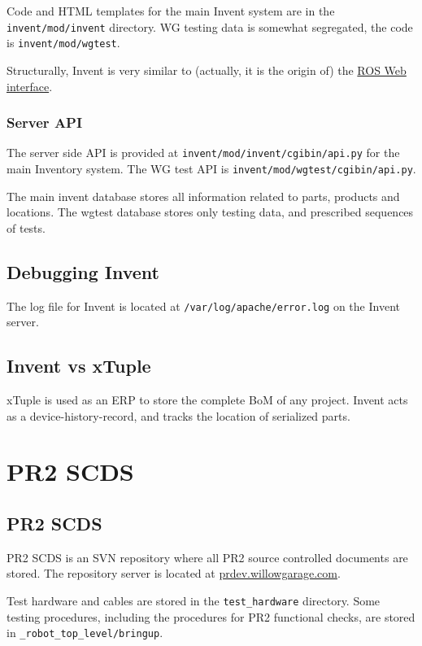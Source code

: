 \documentclass[11pt]{report}
\begin{document}
Code and HTML templates for the main Invent system are in the \texttt{invent/mod/invent} directory. WG testing data is somewhat segregated, the code is \texttt{invent/mod/wgtest}.

Structurally, Invent is very similar to (actually, it is the origin of) the \href{http://www.ros.org/wiki/web\_interface}{ROS Web interface}. 

\subsection{Server API}

The server side API is provided at \texttt{invent/mod/invent/cgibin/api.py} for the main Inventory system. The WG test API is  \texttt{invent/mod/wgtest/cgibin/api.py}.

The main invent database stores all information related to parts, products and locations. The wgtest database stores only testing data, and prescribed sequences of tests. 


\section{Debugging Invent}

The log file for Invent is located at \texttt{/var/log/apache/error.log} on the Invent server. 

\section{Invent vs xTuple}

xTuple is used as an ERP to store the complete BoM of any project. Invent acts as a device-history-record, and tracks the location of serialized parts.

\chapter {PR2 SCDS}

\section{PR2 SCDS}

PR2 SCDS is an SVN repository where all PR2 source controlled documents are stored. The repository server is located at \href{http://prdev.willowgarage.com}{prdev.willowgarage.com}.

Test hardware and cables are stored in the \texttt{test\_hardware} directory. Some testing procedures, including the procedures for PR2 functional checks, are stored in \texttt{\_robot\_top\_level/bringup}.
\end{document}
